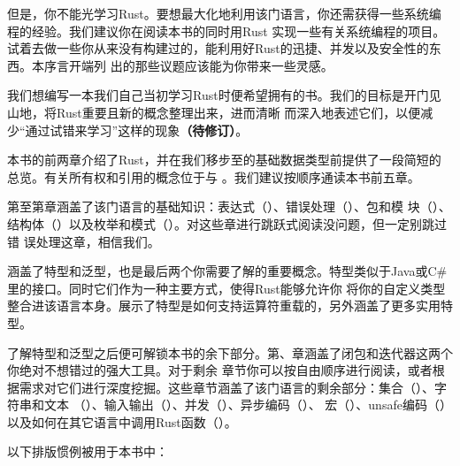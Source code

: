 \medskip
但是，你不能光学习Rust。要想最大化地利用该门语言，你还需获得一些系统编程的经验。我们建议你在阅读本书的同时用Rust
实现一些有关系统编程的项目。试着去做一些你从来没有构建过的，能利用好Rust的迅捷、并发以及安全性的东西。本序言开端列
出的那些议题应该能为你带来一些灵感。


我们想编写一本我们自己当初学习Rust时便希望拥有的书。我们的目标是开门见山地，将Rust重要且新的概念整理出来，进而清晰
而深入地表述它们，以便减少“通过试错来学习”这样的现象\textbf{（待修订）}。


本书的前两章介绍了Rust，并在我们移步至的基础数据类型前提供了一段简短的总览。有关所有权和引用的概念位于与
。我们建议按顺序通读本书前五章。

\medskip
第至第章涵盖了该门语言的基础知识：表达式（）、错误处理（）、包和模
块（）、结构体（）以及枚举和模式（）。对这些章进行跳跃式阅读没问题，但一定别跳过错
误处理这章，相信我们。

\medskip
{}涵盖了特型和泛型，也是最后两个你需要了解的重要概念。特型类似于Java或C\#里的接口。同时它们作为一种主要方式，使得Rust能够允许你
将你的自定义类型整合进该语言本身。展示了特型是如何支持运算符重载的，另外涵盖了更多实用特型。

\medskip
了解特型和泛型之后便可解锁本书的余下部分。第、章涵盖了闭包和迭代器这两个你绝对不想错过的强大工具。对于剩余
章节你可以按自由顺序进行阅读，或者根据需求对它们进行深度挖掘。这些章节涵盖了该门语言的剩余部分：集合（）、字符串和文本
（）、输入输出（）、并发（）、异步编码（）、
宏（）、unsafe编码（）以及如何在其它语言中调用Rust函数（）。


以下排版惯例被用于本书中：

